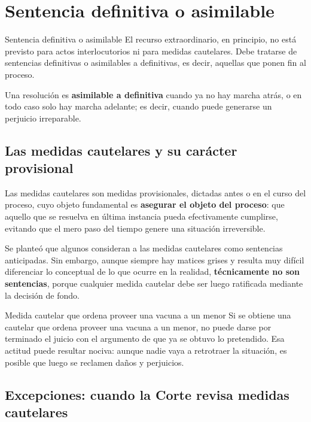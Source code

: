 \documentclass[12pt,oneside]{book}
\begin{document}
\section{Sentencia definitiva o asimilable}

\begin{definition}{Sentencia definitiva o asimilable}
El recurso extraordinario, en principio, no está previsto para actos interlocutorios ni para medidas cautelares. Debe tratarse de sentencias definitivas o asimilables a definitivas, es decir, aquellas que ponen fin al proceso.

Una resolución es \textbf{asimilable a definitiva} cuando ya no hay marcha atrás, o en todo caso solo hay marcha adelante; es decir, cuando puede generarse un perjuicio irreparable.
\end{definition}

\subsection{Las medidas cautelares y su carácter provisional}

Las medidas cautelares son medidas provisionales, dictadas antes o en el curso del proceso, cuyo objeto fundamental es \textbf{asegurar el objeto del proceso}: que aquello que se resuelva en última instancia pueda efectivamente cumplirse, evitando que el mero paso del tiempo genere una situación irreversible.

Se planteó que algunos consideran a las medidas cautelares como sentencias anticipadas. %
Sin embargo, aunque siempre hay matices grises y resulta muy difícil diferenciar lo conceptual de lo que ocurre en la realidad, \textbf{técnicamente no son sentencias}, porque cualquier medida cautelar debe ser luego ratificada mediante la decisión de fondo.

\begin{example}{Medida cautelar que ordena proveer una vacuna a un menor}
Si se obtiene una cautelar que ordena proveer una vacuna a un menor, no puede darse por terminado el juicio con el argumento de que ya se obtuvo lo pretendido. Esa actitud puede resultar nociva: aunque nadie vaya a retrotraer la situación, es posible que luego se reclamen daños y perjuicios.
\end{example}

\subsection{Excepciones: cuando la Corte revisa medidas cautelares}
\end{document}
